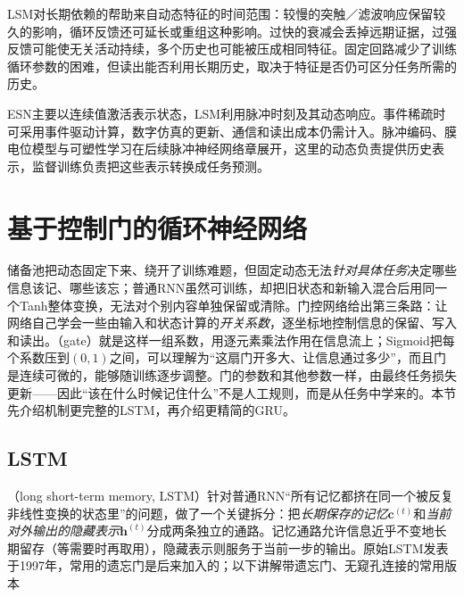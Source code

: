 LSM对长期依赖的帮助来自动态特征的时间范围：较慢的突触／滤波响应保留较久的影响，循环反馈还可延长或重组这种影响。过快的衰减会丢掉远期证据，过强反馈可能使无关活动持续，多个历史也可能被压成相同特征。固定回路减少了训练循环参数的困难，但读出能否利用长期历史，取决于特征是否仍可区分任务所需的历史。

ESN主要以连续值激活表示状态，LSM利用脉冲时刻及其动态响应。事件稀疏时可采用事件驱动计算，数字仿真的更新、通信和读出成本仍需计入。脉冲编码、膜电位模型与可塑性学习在后续脉冲神经网络章展开，这里的动态负责提供历史表示，监督训练负责把这些表示转换成任务预测。

\FloatBarrier
\section{基于控制门的循环神经网络}
\label{sec:rnn-gated}

储备池把动态固定下来、绕开了训练难题，但固定动态无法\emph{针对具体任务}决定哪些信息该记、哪些该忘；普通RNN虽然可训练，却把旧状态和新输入混合后用同一个Tanh整体变换，无法对个别内容单独保留或清除。门控网络给出第三条路：让网络自己学会一些由输入和状态计算的\emph{开关系数}，逐坐标地控制信息的保留、写入和读出。（gate）就是这样一组系数，用逐元素乘法作用在信息流上；Sigmoid把每个系数压到$(0,1)$之间，可以理解为“这扇门开多大、让信息通过多少”，而且门是连续可微的，能够随训练逐步调整。门的参数和其他参数一样，由最终任务损失更新——因此“该在什么时候记住什么”不是人工规则，而是从任务中学来的。本节先介绍机制更完整的LSTM，再介绍更精简的GRU。

\subsection{LSTM}
\label{sec:rnn-lstm}

（long short-term memory, LSTM）针对普通RNN“所有记忆都挤在同一个被反复非线性变换的状态里”的问题，做了一个关键拆分：把\emph{长期保存的记忆}$\bm{c}^{(t)}$和\emph{当前对外输出的隐藏表示}$\bm{h}^{(t)}$分成两条独立的通路。记忆通路允许信息近乎不变地长期留存（等需要时再取用），隐藏表示则服务于当前一步的输出。原始LSTM发表于1997年，常用的遗忘门是后来加入的；以下讲解带遗忘门、无窥孔连接的常用版本

